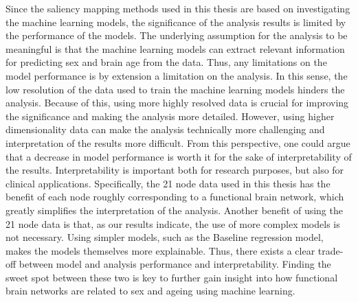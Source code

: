 Since the saliency mapping methods used in this thesis are based on investigating the machine learning models, the significance of the analysis results is limited by the performance of the models. The underlying assumption for the analysis to be meaningful is that the machine learning models can extract relevant information for predicting sex and brain age from the data. Thus, any limitations on the model performance is by extension a limitation on the analysis. In this sense, the low resolution of the data used to train the machine learning models hinders the analysis. Because of this, using more highly resolved data is crucial for improving the significance and making the analysis more detailed. However, using higher dimensionality data can make the analysis technically more challenging and interpretation of the results more difficult. From this perspective, one could argue that a decrease in model performance is worth it for the sake of interpretability of the results. Interpretability is important both for research purposes, but also for clinical applications. Specifically, the 21 node data used in this thesis has the benefit of each node roughly corresponding to a functional brain network, which greatly simplifies the interpretation of the analysis. Another benefit of using the 21 node data is that, as our results indicate, the use of more complex models is not necessary. Using simpler models, such as the Baseline regression model, makes the models themselves more explainable. Thus, there exists a clear trade-off between model and analysis performance and interpretability. Finding the sweet spot between these two is key to further gain insight into how functional brain networks are related to sex and ageing using machine learning. 


